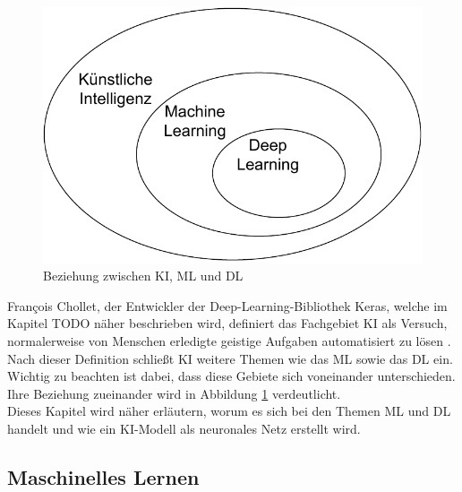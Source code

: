 \begin{figure}
    \includegraphics[width=\textwidth/2]{abbildungen/KI_ML_DL.pdf}
    \caption{Beziehung zwischen \acs{KI}, \acs{ML} und \acs{DL} \cite[S.22]{DL_PY}}
    \label{fig:KI_ML_DL}
\end{figure} 

François Chollet, der Entwickler der Deep-Learning-Bibliothek Keras, welche im Kapitel TODO näher beschrieben wird, definiert
das Fachgebiet \ac{KI} als \glqq [den] Versuch, normalerweise von Menschen erledigte geistige Aufgaben automatisiert zu lösen\grqq{} \cite[S.22]{DL_PY}.
Nach dieser Definition schließt \ac{KI} weitere Themen wie das \ac{ML} sowie das \ac{DL} ein. Wichtig zu beachten ist dabei,
dass diese Gebiete sich voneinander unterschieden. Ihre Beziehung zueinander wird in Abbildung \ref*{fig:KI_ML_DL} verdeutlicht.\\

Dieses Kapitel wird näher erläutern, worum es sich bei den Themen \ac{ML} und \ac{DL} handelt und wie ein \ac{KI}-Modell als neuronales Netz erstellt wird.

\subsection{Maschinelles Lernen}

